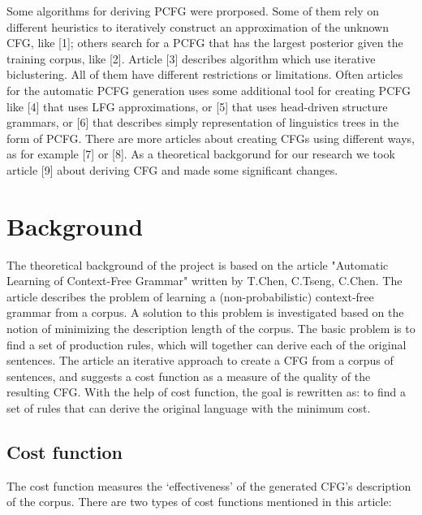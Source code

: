 \documentclass[paper=a4, fontsize=11pt]{scrartcl} %
\numberwithin{equation}{section} %
\numberwithin{figure}{section} %
\numberwithin{table}{section} %
\begin{document}
Some algorithms for deriving PCFG were prorposed. Some of them rely on different heuristics to iteratively construct an approximation of the unknown CFG, like [1]; others search for a PCFG that has the largest posterior given the training corpus, like [2]. Article [3] describes algorithm which use iterative biclustering. All of them have different restrictions or limitations. Often articles for the automatic PCFG generation uses some additional tool for creating PCFG like [4] that uses LFG approximations, or [5] that uses head-driven structure grammars, or [6] that describes simply representation of linguistics trees in the form of PCFG. There are more articles about creating CFGs using different ways, as for example [7] or [8]. As a theoretical backgorund for our research we took article [9] about deriving CFG and made some significant changes.



\section{Background}

The theoretical background of the project is based on the article "Automatic Learning of Context-Free Grammar" written by T.Chen, C.Tseng, C.Chen. The article describes the problem of learning a (non-probabilistic) context-free grammar from a corpus. A solution to this problem is investigated based on the notion of minimizing the description length of the corpus. 
The basic problem is to find a set of production rules, which will together can derive each of the original sentences. The article an iterative approach to create a CFG from a corpus of sentences, and suggests a cost function as a measure of the quality of the resulting CFG. With the help of cost function, the goal is rewritten as: to find a set of rules that can derive the original language with the minimum cost.

\subsection{Cost function}

The cost function measures the `effectiveness' of the generated CFG's description of the corpus. There are two types of cost functions mentioned in this article:
\end{document}
